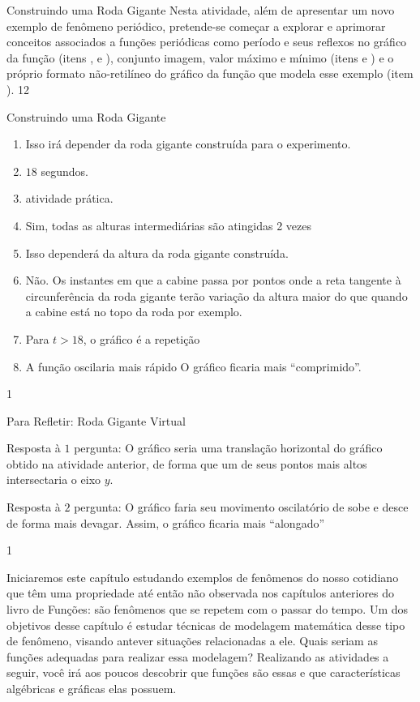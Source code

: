 \begin{sugestions}{Construindo uma Roda Gigante}
{
Nesta atividade, além de apresentar um novo exemplo de
fenômeno periódico, pretende-se começar a explorar e
aprimorar conceitos associados a funções periódicas como
período e seus reflexos no gráfico da função (itens ,  e ), conjunto imagem, valor máximo e mínimo (itens  e
) e o próprio formato não-retilíneo do gráfico da função
que modela esse exemplo (item ).
}{1}{2}
\end{sugestions}
\clearmargin
\begin{answer}{Construindo uma Roda Gigante}
{
\begin{enumerate}
\item Isso irá depender da roda gigante construída para o
experimento.
\item $18$ segundos.
\item atividade prática.
\item Sim, todas as alturas intermediárias são atingidas 2 vezes
\item Isso dependerá da altura da roda gigante construída.
\item Não. Os instantes em que a cabine passa por pontos onde a
reta tangente à circunferência da roda gigante terão variação
da altura maior do que quando a cabine está no topo da roda
por exemplo.
\item Para $t>18$, o gráfico é a repetição
\item A função oscilaria mais rápido O gráfico ficaria mais
“comprimido”.
\end{enumerate}
}{1}
\end{answer}
\clearmargin
\begin{answer}{Para Refletir: Roda Gigante Virtual}
{
Resposta à $1$ pergunta: O gráfico seria uma translação horizontal do gráfico obtido na atividade anterior, de forma que um de seus pontos mais altos intersectaria o eixo $y$.

Resposta à $2$ pergunta: O gráfico faria seu movimento oscilatório de sobe e desce de forma mais devagar. Assim, o gráfico ficaria mais “alongado”
}{1}
\end{answer}
\label{trig-exp1}

Iniciaremos este capítulo estudando exemplos de fenômenos do nosso cotidiano que têm uma propriedade até então não observada nos capítulos anteriores do livro de Funções: são fenômenos que se repetem com o passar do tempo. Um dos objetivos desse capítulo é estudar técnicas de modelagem matemática desse tipo de fenômeno, visando antever situações relacionadas a ele. Quais seriam as funções adequadas para realizar essa modelagem? Realizando as atividades a seguir, você irá aos poucos descobrir que funções são essas e que características algébricas e gráficas elas possuem.

